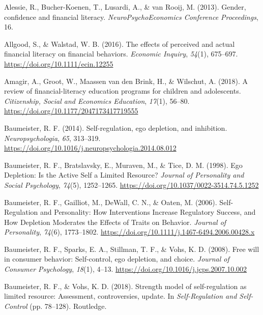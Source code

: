 \documentclass[
  letterpaper,
  DIV=11,
  numbers=noendperiod]{scrartcl}
\newlength{\cslhangindent}
\newlength{\cslentryspacingunit} %
\newenvironment{CSLReferences}[2] %
 {%
  \setlength{\parindent}{0pt}
  \ifodd #1
  \let\oldpar\par
  \def\par{\hangindent=\cslhangindent\oldpar}
  \fi
  \setlength{\parskip}{#2\cslentryspacingunit}
 }%
 {}
\begin{document}
\hypertarget{refs}{}
\begin{CSLReferences}{1}{0}
\leavevmode{}%
Alessie, R., Bucher-Koenen, T., Lusardi, A., \& van Rooij, M. (2013).
Gender, confidence and financial literacy. \emph{NeuroPsychoEconomics
Conference Proceedings}, 16.

\leavevmode{}%
Allgood, S., \& Walstad, W. B. (2016). The effects of perceived and
actual financial literacy on financial behaviors. \emph{Economic
Inquiry}, \emph{54}(1), 675--697.
\url{https://doi.org/10.1111/ecin.12255}

\leavevmode{}%
Amagir, A., Groot, W., Maassen van den Brink, H., \& Wilschut, A.
(2018). A review of financial-literacy education programs for children
and adolescents. \emph{Citizenship, Social and Economics Education},
\emph{17}(1), 56--80. \url{https://doi.org/10.1177/2047173417719555}

\leavevmode{}%
Baumeister, R. F. (2014). Self-regulation, ego depletion, and
inhibition. \emph{Neuropsychologia}, \emph{65}, 313--319.
\url{https://doi.org/10.1016/j.neuropsychologia.2014.08.012}

\leavevmode{}%
Baumeister, R. F., Bratslavsky, E., Muraven, M., \& Tice, D. M. (1998).
Ego {Depletion}: {Is} the {Active Self} a {Limited Resource}?
\emph{Journal of Personality and Social Psychology}, \emph{74}(5),
1252--1265. \url{https://doi.org/10.1037/0022-3514.74.5.1252}

\leavevmode{}%
Baumeister, R. F., Gailliot, M., DeWall, C. N., \& Oaten, M. (2006).
Self-{Regulation} and {Personality}: {How Interventions Increase
Regulatory Success}, and {How Depletion Moderates} the {Effects} of
{Traits} on {Behavior}. \emph{Journal of Personality}, \emph{74}(6),
1773--1802. \url{https://doi.org/10.1111/j.1467-6494.2006.00428.x}

\leavevmode{}%
Baumeister, R. F., Sparks, E. A., Stillman, T. F., \& Vohs, K. D.
(2008). Free will in consumer behavior: {Self-control}, ego depletion,
and choice. \emph{Journal of Consumer Psychology}, \emph{18}(1), 4--13.
\url{https://doi.org/10.1016/j.jcps.2007.10.002}

\leavevmode{}%
Baumeister, R. F., \& Vohs, K. D. (2018). Strength model of
self-regulation as limited resource: {Assessment}, controversies,
update. In \emph{Self-{Regulation} and {Self-Control}} (pp. 78--128).
{Routledge}.


\end{CSLReferences}
\end{document}
